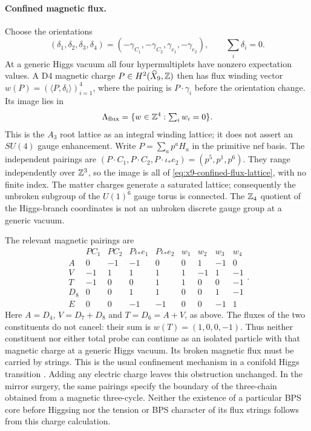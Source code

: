\paragraph{Confined magnetic flux.}
Choose the orientations
\begin{equation}
 (\delta_1,\delta_2,\delta_3,\delta_4)
 =(-\gamma_{C_1},-\gamma_{C_2},\gamma_{e_1},-\gamma_{e_2}),
 \qquad \sum_i\delta_i=0.
 \label{eq:x9-oriented-condensate}
\end{equation}
At a generic Higgs vacuum all four hypermultiplets have nonzero
expectation values. A D4 magnetic charge $P\in H^2(\widehat X_9,\mathbb Z)$
then has flux winding vector
$w(P)=(\langle P,\delta_i\rangle)_{i=1}^4$, where the pairing
is $P\cdot\gamma_i$ before the orientation change. Its image lies in
\begin{equation}
 \Lambda_{\rm flux}=\{w\in\mathbb Z^4:\textstyle\sum_iw_i=0\}.
 \label{eq:x9-confined-flux-lattice}
\end{equation}
This is the $A_3$ root lattice as an integral winding lattice; it
does not assert an $SU(4)$ gauge enhancement. Write
$P=\sum_a p^aH_a$ in the primitive nef basis. The independent pairings are
$(P\cdot C_1,P\cdot C_2,P\cdot\iota_*e_2)=(p^5,p^1,p^6)$.
They range independently over $\mathbb Z^3$, so the image is all of
\eqref{eq:x9-confined-flux-lattice}, with no finite index.
The matter charges generate a saturated lattice; consequently
the unbroken subgroup of the $U(1)^6$ gauge torus is connected.
The $\mathbb Z_4$ quotient of the Higgs-branch coordinates is not an
unbroken discrete gauge group at a generic vacuum.

The relevant magnetic pairings are
\begin{equation}
 \begin{array}{c|rrrr|rrrr}
 &P C_1&P C_2&P\iota_*e_1&P\iota_*e_2
 &w_1&w_2&w_3&w_4\\\hline
 A&0&-1&-1&0&0&1&-1&0\\
 V&-1&1&1&1&1&-1&1&-1\\
 T&-1&0&0&1&1&0&0&-1\\
 D_8&0&0&1&1&0&0&1&-1\\
 E&0&0&-1&-1&0&0&-1&1
 \end{array}.
 \label{eq:x9-full-probe-flux}
\end{equation}
Here $A=D_4$, $V=D_7+D_8$ and $T=D_6=A+V$, as above.
The fluxes of the two constituents do not cancel: their sum is
$w(T)=(1,0,0,-1)$. Thus neither constituent nor either total
probe can continue as an isolated particle with that magnetic
charge at a generic Higgs vacuum. Its broken magnetic flux must
be carried by strings. This is the usual confinement mechanism
in a conifold Higgs transition \cite[Sections~3--4]{Greene:1996Confinement}.
Adding any electric charge leaves this obstruction unchanged.
In the mirror surgery, the same pairings specify the boundary
of the three-chain obtained from a magnetic three-cycle.
Neither the existence of a particular BPS core before Higgsing
nor the tension or BPS character of its flux strings follows
from this charge calculation.
